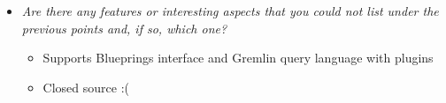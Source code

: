 
\begin{itemize}
\item \emph{Are there any features or interesting aspects that you could not list under the previous points and, if so, which one?}
\begin{itemize}
	\item Supports Blueprings interface and Gremlin query language with plugins
	\item Closed source :(
\end{itemize}
\end{itemize}